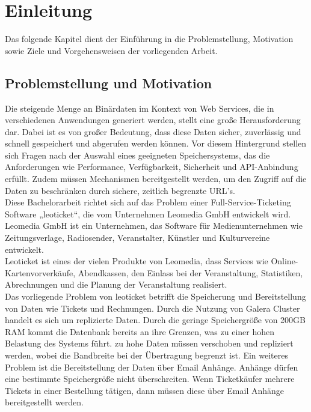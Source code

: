 \chapter{Einleitung}

Das folgende Kapitel dient der Einführung in die Problemstellung, Motivation sowie Ziele und Vorgehensweisen der vorliegenden Arbeit.

\section{Problemstellung und Motivation}

Die steigende Menge an Binärdaten im Kontext von Web Services, die in verschiedenen Anwendungen generiert werden, stellt eine große Herausforderung dar. Dabei ist es von großer Bedeutung, dass diese Daten sicher, zuverlässig und schnell gespeichert und abgerufen werden können. Vor diesem Hintergrund stellen sich Fragen nach der Auswahl eines geeigneten Speichersystems, das die Anforderungen wie Performance, Verfügbarkeit, Sicherheit und API-Anbindung erfüllt.  Zudem müssen Mechanismen bereitgestellt werden, um den Zugriff auf die Daten zu beschränken durch sichere, zeitlich begrenzte URL’s.\\

Diese Bachelorarbeit richtet sich auf das Problem einer Full-Service-Ticketing Software „leoticket“, die vom Unternehmen Leomedia GmbH entwickelt wird. 
Leomedia GmbH ist ein Unternehmen, das Software für Medienunternehmen wie Zeitungsverlage, Radiosender, Veranstalter, Künstler und Kulturvereine entwickelt. \textcite{leomedia-web}\\
Leoticket ist eines der vielen Produkte von Leomedia, dass Services wie Online-Kartenvorverkäufe, Abendkassen, den Einlass bei der Veranstaltung, Statistiken, Abrechnungen und die Planung der Veranstaltung realisiert.\textcite{leomedia-web}\\ 


Das vorliegende Problem von leoticket betrifft die Speicherung und Bereitstellung von Daten wie Tickets und Rechnungen. Durch die Nutzung von Galera Cluster handelt es sich um replizierte Daten. Durch die geringe Speichergröße von 200GB RAM kommt die Datenbank bereits an ihre Grenzen, was zu einer hohen Belastung des Systems führt. zu hohe Daten müssen verschoben und repliziert werden, wobei die Bandbreite bei der Übertragung begrenzt ist. Ein weiteres Problem ist die Bereitstellung der Daten über Email Anhänge. Anhänge dürfen eine bestimmte Speichergröße nicht überschreiten. Wenn Ticketkäufer mehrere Tickets in einer Bestellung tätigen, dann müssen diese über Email Anhänge bereitgestellt werden.\\

